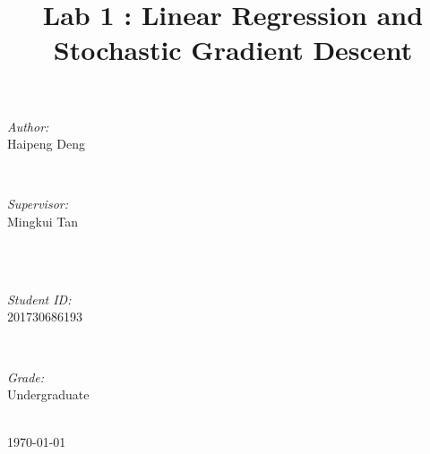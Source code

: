 \documentclass[journal, a4paper]{IEEEtran}
\begin{document}
\begin{titlepage}
\begin{minipage}{0.4\textwidth}
\begin{flushleft} \large
\emph{Author:}\\
Haipeng Deng %
\end{flushleft}
\end{minipage}
~
\begin{minipage}{0.4\textwidth}
\begin{flushright} \large
\emph{Supervisor:} \\
Mingkui Tan %
\end{flushright}
\end{minipage}\\[2cm]
~
\begin{minipage}{0.4\textwidth}
\begin{flushleft} \large
\emph{Student ID:}\\
201730686193
\end{flushleft}
\end{minipage}
~
\begin{minipage}{0.4\textwidth}
\begin{flushright} \large
\emph{Grade:} \\
Undergraduate
\end{flushright}
\end{minipage}\\[2cm]



{\large \today}\\[2cm] %



\vfill %

\end{titlepage}

	\title{Lab 1 : Linear Regression and Stochastic Gradient Descent}
	\maketitle
\end{document}
